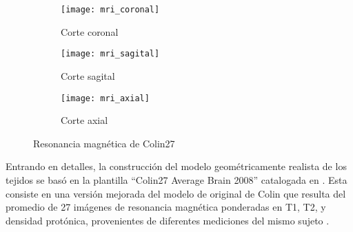 \begin{figure}[tb]
	\centering
	\begin{subfigure}{0.49\textwidth}
		\centering
		\texttt{[image: mri\_coronal]}
		\caption{Corte coronal}
		\label{fig:methodology:coronal}
		\vspace{0.1cm} %
	\end{subfigure}
	\begin{subfigure}{0.49\textwidth}
		\centering
		\texttt{[image: mri\_sagital]}
		\caption{Corte sagital}
		\label{fig:methodology:sagital}
		\vspace{0.1cm} %
	\end{subfigure}
	\begin{subfigure}{0.49\textwidth}
		\centering
		\texttt{[image: mri\_axial]}
		\caption{Corte axial}
		\label{fig:methodology:axial}
	\end{subfigure}
	\caption{Resonancia magnética de Colin27 \cite{Aubert-Broche2006}}
	\label{fig:methodology:mri}
\end{figure}

Entrando en detalles, la construcción del modelo geométricamente realista de los tejidos se basó en la plantilla ``Colin27 Average Brain 2008'' catalogada en \cite{Aubert-Broche2006}.
Esta consiste en una versión mejorada del modelo de original de Colin que resulta del promedio de 27 imágenes de resonancia magnética ponderadas en T1, T2, y densidad protónica, provenientes de diferentes mediciones del mismo sujeto \cite{Collins1998, Holmes1998}.

